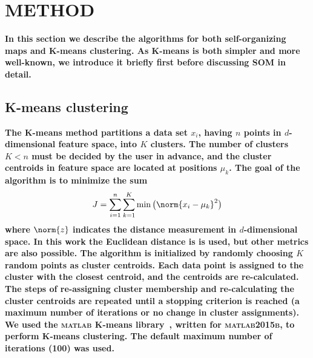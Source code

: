 
\section{METHOD}
\label{sec: method_somz}

\textbf{In this section we describe the algorithms for both self-organizing maps and K-means clustering. As K-means is both simpler and more well-known, we introduce it briefly first before discussing SOM in detail.} 


\subsection{K-means clustering}
\label{sec: kmeans_method}

\textbf{
The K-means method partitions a data set $x_i$, having $n$ points in $d$-dimensional feature space, into $K$ clusters.
The number of clusters $K<n$ must be decided by the user in advance, and the cluster centroids in feature space are located at positions $\mu_k$.
The goal of the algorithm is to minimize the sum
\begin{equation}
\label{eq:km_sos}
J = \sum_{i=1}^n \sum_{k=1}^K \min \big( \norm{x_i - \mu_k}^2 \big)
\end{equation}
where $\norm{z}$ indicates the distance measurement in $d$-dimensional space. In this work the Euclidean distance is is used, but other metrics are also possible.
The algorithm is initialized by randomly choosing $K$ random points as cluster centroids.
Each data point is assigned to the cluster with the closest centroid, and the centroids are re-calculated.
The steps of re-assigning cluster membership and re-calculating the cluster centroids are repeated until a stopping criterion is reached (a maximum number of iterations or no change in cluster assignments).
We used the \textsc{matlab} K-means library~\citep{Seber84, Spath85}, written for \textsc{matlab2015b}, to perform  K-means clustering.
The default maximum number of iterations (100) was used.
}

